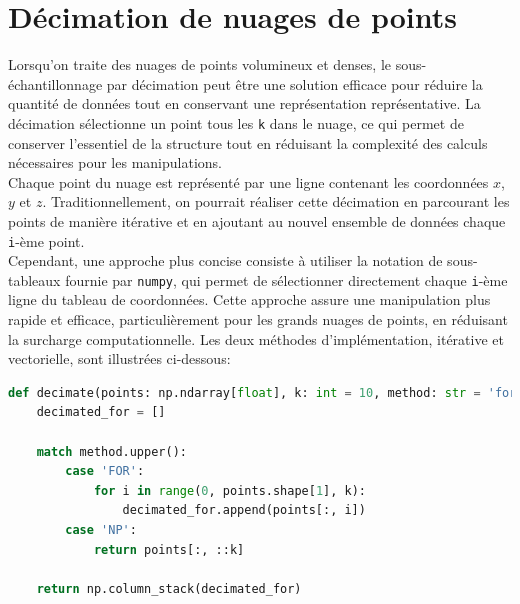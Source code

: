 \documentclass[../5RO17_TP4.tex]{subfiles}
\begin{document}
\section{Décimation de nuages de points}
\noindent Lorsqu'on traite des nuages de points volumineux et denses, le sous-échantillonnage par décimation peut être une solution efficace pour réduire la quantité de données tout en conservant une représentation représentative. La décimation sélectionne un point tous les \texttt{k} dans le nuage, ce qui permet de conserver l'essentiel de la structure tout en réduisant la complexité des calculs nécessaires pour les manipulations.\\

\noindent Chaque point du nuage est représenté par une ligne contenant les coordonnées $x$, $y$ et $z$. Traditionnellement, on pourrait réaliser cette décimation en parcourant les points de manière itérative et en ajoutant au nouvel ensemble de données chaque \texttt{i}-ème point.\\

\noindent Cependant, une approche plus concise consiste à utiliser la notation de sous-tableaux fournie par \texttt{numpy}, qui permet de sélectionner directement chaque \texttt{i}-ème ligne du tableau de coordonnées. Cette approche assure une manipulation plus rapide et efficace, particulièrement pour les grands nuages de points, en réduisant la surcharge computationnelle. Les deux méthodes d'implémentation, itérative et vectorielle, sont illustrées ci-dessous:\\

\begin{scriptsize}\mycode
	\begin{lstlisting}[language=Python, caption=\texttt{decimate()}]
def decimate(points: np.ndarray[float], k: int = 10, method: str = 'for') -> np.ndarray[float]:
    decimated_for = []

    match method.upper():
        case 'FOR':
            for i in range(0, points.shape[1], k):
                decimated_for.append(points[:, i])
        case 'NP':
            return points[:, ::k]

    return np.column_stack(decimated_for)
	\end{lstlisting}
\end{scriptsize}
\end{document}
